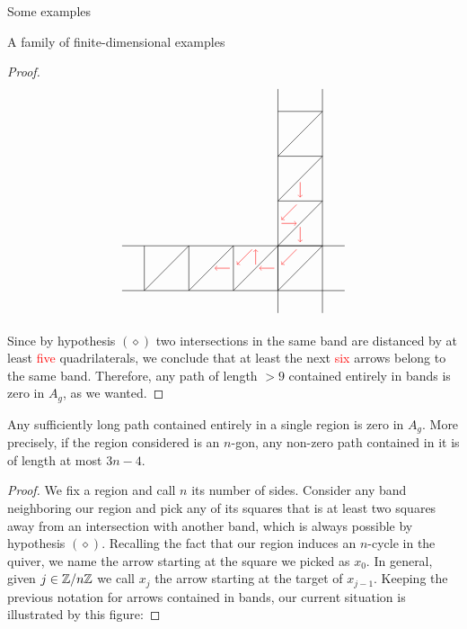 \begin{chapter}{Some examples}
\begin{section}{A family of finite-dimensional examples}
\begin{proof}
\[
\begin{tikzpicture}
\draw (-3.5*1.25, 0) -- (1.5*1.25, 0);
\draw (-3.5*1.25, -1.25) -- (1.5*1.25, -1.25);
\draw (0,3.5*1.25) -- (0,-1.5*1.25);
\draw (1.25,3.5*1.25) -- (1.25,-1.5*1.25);

\foreach \x in {-3.75,-2.5,...,0}
{
\draw (\x,-1.25) -- (\x+1.25, 0);
\draw (0, -\x) -- (1.25, -\x);
\draw (\x,0) -- (\x, -1.25);
}

\foreach \x in {0,1.25,...,2.5}
\draw (0, \x) -- (1.25, \x+1.25);

\draw[->, red] (0.5*1.25, 1.5*1.25 - 0.1) -- (0.5*1.25, 1.25 + 0.1);
\draw[->, red] (0.5*1.25 - 0.1, 1.25-0.1) -- (0.1, 0.5*1.25+0.1);
\draw[->, red] (0.1, 0.5*1.25) -- (0.5*1.25 - 0.1, 0.5*1.25);
\draw[->, red] (0.5*1.25, 0.5*1.25-0.1) -- (0.5*1.25, 0.1);
\draw[->, red] (0.5*1.25 - 0.1, -0.1) -- (0.1, -0.5*1.25+0.1);
\draw[->, red] (-0.1, -0.5*1.25) -- (-0.5*1.25+0.1, -0.5*1.25);
\draw[->, red] (-0.5*1.25, -0.5*1.25+0.1) -- (-0.5*1.25, -0.1);
\draw[->, red] (-0.5*1.25 - 0.1, -0.1) -- (-1.25 + 0.1, -0.5*1.25+0.1);
\draw[->, red] (-1.25 -0.1, -0.5*1.25) -- (-1.5*1.25+0.1, -0.5*1.25);
\end{tikzpicture}
\]

Since by hypothesis $(\diamond)$ two intersections in the same band are distanced by at least \textcolor{red}{five} quadrilaterals, we conclude that at least the next \textcolor{red}{six} arrows belong to the same band. Therefore, any path of length $>9$ contained entirely in bands is zero in $A_g$, as we wanted.
\end{proof}

\begin{lemma} Any sufficiently long path contained entirely in a single region is zero in $A_g$. More precisely, if the region considered is an $n$-gon, any non-zero path contained in it is of length at most $3n-4$.
\end{lemma}
\begin{proof} We fix a region and call $n$ its number of sides. Consider any band neighboring our region and pick any of its squares that is at least two squares away from an intersection with another band, which is always possible by hypothesis $(\diamond)$. Recalling the fact that our region induces an $n$-cycle in the quiver, we name the arrow starting at the square we picked as $x_0$. In general, given $j\in \mathbb{Z}/n\mathbb{Z}$ we call $x_j$ the arrow starting at the target of $x_{j-1}$. Keeping the previous notation for arrows contained in bands, our current situation is illustrated by this figure:


\end{proof}
\end{section}
\end{chapter}
